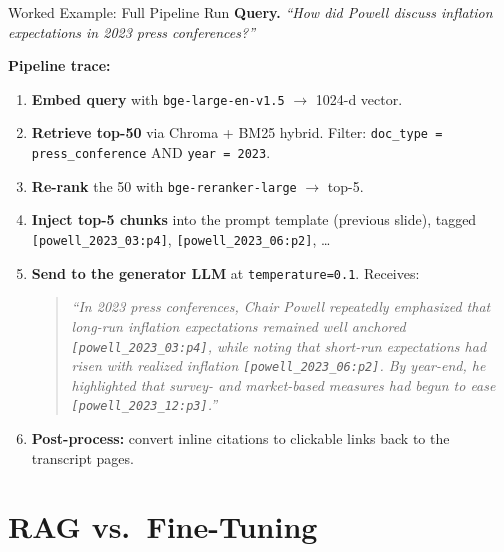 \begin{frame}{Worked Example: Full Pipeline Run}
\textbf{Query.} \emph{``How did Powell discuss inflation expectations in 2023 press conferences?''}

\smallskip
\textbf{Pipeline trace:}
\begin{enumerate}
\item \textbf{Embed query} with \texttt{bge-large-en-v1.5} $\to$ 1024-d vector.
\smallskip
\item \textbf{Retrieve top-50} via Chroma + BM25 hybrid. Filter: \texttt{doc\_type = press\_conference} AND \texttt{year = 2023}.
\smallskip
\item \textbf{Re-rank} the 50 with \texttt{bge-reranker-large} $\to$ top-5.
\smallskip
\item \textbf{Inject top-5 chunks} into the prompt template (previous slide), tagged \texttt{[powell\_2023\_03:p4]}, \texttt{[powell\_2023\_06:p2]}, \dots
\smallskip
\item \textbf{Send to the generator LLM} at \texttt{temperature=0.1}. Receives:
\begin{quote}
\footnotesize\itshape
``In 2023 press conferences, Chair Powell repeatedly emphasized that long-run inflation expectations remained well anchored \texttt{[powell\_2023\_03:p4]}, while noting that short-run expectations had risen with realized inflation \texttt{[powell\_2023\_06:p2]}. By year-end, he highlighted that survey- and market-based measures had begun to ease \texttt{[powell\_2023\_12:p3]}.''
\end{quote}
\item \textbf{Post-process:} convert inline citations to clickable links back to the transcript pages.
\end{enumerate}
\end{frame}

\section{RAG vs.\ Fine-Tuning}

